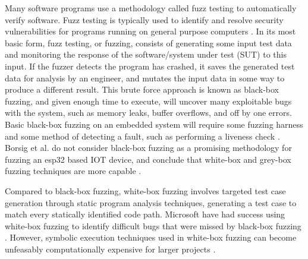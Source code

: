 \documentclass[../report.tex]{subfiles}
\begin{document}

Many software programs use a methodology called fuzz testing to automatically
verify software. Fuzz testing is typically used to identify and resolve
security vulnerabilities for programs running on general purpose computers
\citep{Google_2023}. In its most basic form, fuzz testing, or fuzzing, consists
of generating some input test data and monitoring the response of the
software/system under test (SUT) to this input. If the fuzzer detects the
program has crashed, it saves the generated test data for analysis by an
engineer, and mutates the input data in some way to produce a different result.
This brute force approach is known as black-box fuzzing, and given enough time
to execute, will uncover many exploitable bugs with the system, such as memory
leaks, buffer overflows, and off by one errors. Basic black-box fuzzing on an
embedded system will require some fuzzing harness \citep{Eisele_et_al_2022} and
some method of detecting a fault, such as performing a liveness check
\citep{Yun_2022}. Borsig et al. do not consider black-box fuzzing as a
promising methodology for fuzzing an esp32 based IOT device, and conclude that
white-box and grey-box fuzzing techniques are more capable \citep{Borsig_2020}.

Compared to black-box fuzzing, white-box fuzzing involves targeted test case
generation through static program analysis techniques, generating a test case
to match every statically identified code path. Microsoft have had success
using white-box fuzzing to identify difficult bugs that were missed by
black-box fuzzing \citep{Godefroid_2012}. However, symbolic execution
techniques used in white-box fuzzing can become unfeasably computationally
expensive for larger projects \citep{Krishnamoorthy_2010}.
\end{document}
